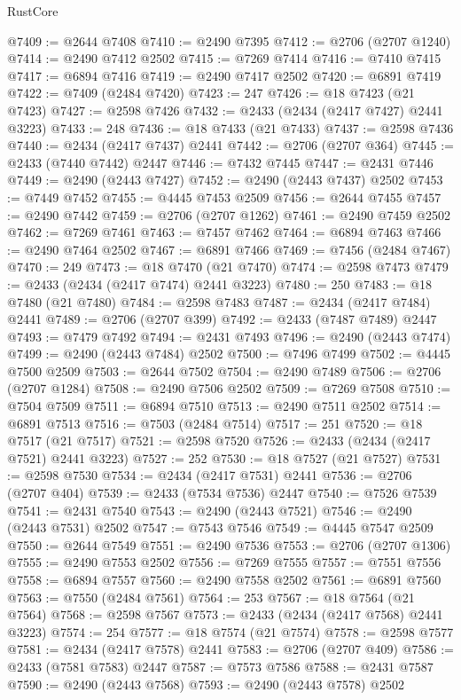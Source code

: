 \begin{lexlean}{RustCore}
\begin{coremodule}
@7409 := @2644 @7408
@7410 := @2490 @7395
@7412 := @2706 (@2707 @1240)
@7414 := @2490 @7412 @2502
@7415 := @7269 @7414
@7416 := @7410 @7415
@7417 := @6894 @7416
@7419 := @2490 @7417 @2502
@7420 := @6891 @7419
@7422 := @7409 (@2484 @7420)
@7423 := 247
@7426 := @18 @7423 (@21 @7423)
@7427 := @2598 @7426
@7432 := @2433 (@2434 (@2417 @7427) @2441 @3223)
@7433 := 248
@7436 := @18 @7433 (@21 @7433)
@7437 := @2598 @7436
@7440 := @2434 (@2417 @7437) @2441
@7442 := @2706 (@2707 @364)
@7445 := @2433 (@7440 @7442) @2447
@7446 := @7432 @7445
@7447 := @2431 @7446
@7449 := @2490 (@2443 @7427)
@7452 := @2490 (@2443 @7437) @2502
@7453 := @7449 @7452
@7455 := @4445 @7453 @2509
@7456 := @2644 @7455
@7457 := @2490 @7442
@7459 := @2706 (@2707 @1262)
@7461 := @2490 @7459 @2502
@7462 := @7269 @7461
@7463 := @7457 @7462
@7464 := @6894 @7463
@7466 := @2490 @7464 @2502
@7467 := @6891 @7466
@7469 := @7456 (@2484 @7467)
@7470 := 249
@7473 := @18 @7470 (@21 @7470)
@7474 := @2598 @7473
@7479 := @2433 (@2434 (@2417 @7474) @2441 @3223)
@7480 := 250
@7483 := @18 @7480 (@21 @7480)
@7484 := @2598 @7483
@7487 := @2434 (@2417 @7484) @2441
@7489 := @2706 (@2707 @399)
@7492 := @2433 (@7487 @7489) @2447
@7493 := @7479 @7492
@7494 := @2431 @7493
@7496 := @2490 (@2443 @7474)
@7499 := @2490 (@2443 @7484) @2502
@7500 := @7496 @7499
@7502 := @4445 @7500 @2509
@7503 := @2644 @7502
@7504 := @2490 @7489
@7506 := @2706 (@2707 @1284)
@7508 := @2490 @7506 @2502
@7509 := @7269 @7508
@7510 := @7504 @7509
@7511 := @6894 @7510
@7513 := @2490 @7511 @2502
@7514 := @6891 @7513
@7516 := @7503 (@2484 @7514)
@7517 := 251
@7520 := @18 @7517 (@21 @7517)
@7521 := @2598 @7520
@7526 := @2433 (@2434 (@2417 @7521) @2441 @3223)
@7527 := 252
@7530 := @18 @7527 (@21 @7527)
@7531 := @2598 @7530
@7534 := @2434 (@2417 @7531) @2441
@7536 := @2706 (@2707 @404)
@7539 := @2433 (@7534 @7536) @2447
@7540 := @7526 @7539
@7541 := @2431 @7540
@7543 := @2490 (@2443 @7521)
@7546 := @2490 (@2443 @7531) @2502
@7547 := @7543 @7546
@7549 := @4445 @7547 @2509
@7550 := @2644 @7549
@7551 := @2490 @7536
@7553 := @2706 (@2707 @1306)
@7555 := @2490 @7553 @2502
@7556 := @7269 @7555
@7557 := @7551 @7556
@7558 := @6894 @7557
@7560 := @2490 @7558 @2502
@7561 := @6891 @7560
@7563 := @7550 (@2484 @7561)
@7564 := 253
@7567 := @18 @7564 (@21 @7564)
@7568 := @2598 @7567
@7573 := @2433 (@2434 (@2417 @7568) @2441 @3223)
@7574 := 254
@7577 := @18 @7574 (@21 @7574)
@7578 := @2598 @7577
@7581 := @2434 (@2417 @7578) @2441
@7583 := @2706 (@2707 @409)
@7586 := @2433 (@7581 @7583) @2447
@7587 := @7573 @7586
@7588 := @2431 @7587
@7590 := @2490 (@2443 @7568)
@7593 := @2490 (@2443 @7578) @2502

\end{coremodule}
\end{lexlean}
